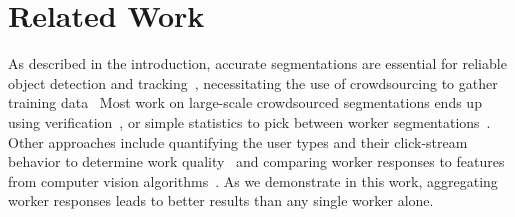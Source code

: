 \documentclass[letterpaper]{article} %
\begin{document}
\section{Related Work}


\par As described in the introduction, accurate segmentations are essential for reliable 
object detection and tracking~\cite{sivic2005discovering,felzenszwalb2008discriminatively,viola2004robust,torralba2004sharing,torralba2003contextual,fe2003bayesian,Bearman2016}, necessitating the use of crowdsourcing to gather training data~\cite{AdrianaKovashka2016}
Most work on large-scale crowdsourced segmentations ends up using 
verification~\cite{Lin2014,MartinFTM01,Torralba2010,pascal-voc-2012,Li2009}, 
or simple statistics to pick between worker segmentations~\cite{Vittayakorn2011}.
Other approaches include quantifying the user types and their click-stream behavior 
to determine work quality~\cite{Cabezas2015,Sameki2015}
and comparing worker responses to features from computer vision algorithms~\cite{Vittayakorn2011,Russakovsky2015}.
As we demonstrate in this work, aggregating worker responses leads to better results than
any single worker alone. 
\end{document}
